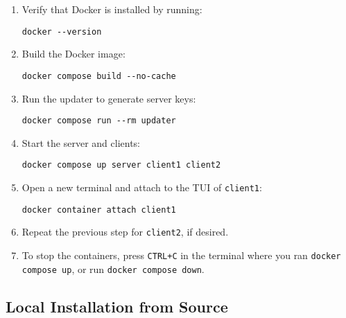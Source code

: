 \begin{enumerate}
    \item Verify that Docker is installed by running:

        \begin{lstlisting}
docker --version
        \end{lstlisting}

    \item Build the Docker image:

        \begin{lstlisting}
docker compose build --no-cache
        \end{lstlisting}

    \item Run the updater to generate server keys:

        \begin{lstlisting}
docker compose run --rm updater
        \end{lstlisting}

    \item Start the server and clients:

        \begin{lstlisting}
docker compose up server client1 client2
        \end{lstlisting}

    \item Open a new terminal and attach to the TUI of \texttt{client1}:

        \begin{lstlisting}
docker container attach client1
        \end{lstlisting}

    \item Repeat the previous step for \texttt{client2}, if desired.

    \item To stop the containers, press \texttt{CTRL+C} in the terminal where you ran \texttt{docker compose up}, or run \texttt{docker compose down}.

\end{enumerate}

\subsection{Local Installation from Source}
\label{sec:source}

